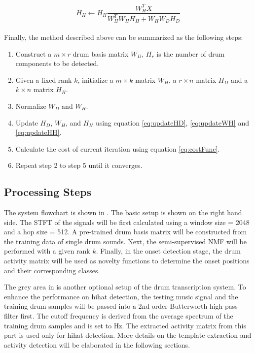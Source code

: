 \documentclass{article}
\begin{document}
\begin{equation}
H_{H} \leftarrow H_{H}\frac{W_{H}^T X}{W_{H}^T W_{H} H_{H} + W_{H} W_{D} H_{D}}
\label{eq:updateHH}
\end{equation}\\


Finally, the method described above can be summarized as the following steps:
\begin{enumerate}
    \item   Construct a $m \times r$ drum basis matrix $W_D$, $H_r$ is the number of drum components to be detected.
    \item   Given a fixed rank $k$, initialize a $m \times k$ matrix $W_H$, a $r \times n$ matrix $H_D$ and a $k \times n$ matrix $H_H$.
    \item   Normalize $W_D$ and $W_H$.
    \item   Update $H_D$, $W_H$, and $H_H$ using equation \eqref{eq:updateHD}, \eqref{eq:updateWH} and \eqref{eq:updateHH}.
    \item   Calculate the cost of current iteration using equation \eqref{eq:costFunc}.
    \item   Repeat step 2 to step 5 until it converges.
\end{enumerate}

\subsection{Processing Steps}\label{subsec:processing steps}

The system flowchart is shown in . The basic setup is shown on the right hand side. The STFT of the signals will be first calculated using a window size = 2048 and a hop size = 512. A pre-trained drum basis matrix will be constructed from the training data of single drum sounds. Next, the semi-supervised NMF will be performed with a given rank $k$. Finally, in the onset detection stage, the drum activity matrix will be used as novelty functions to determine the onset positions and their corresponding classes.  

The grey area in  is another optional setup of the drum transcription system. To enhance the performance on hihat detection, the testing music signal and the training drum samples will be passed into a 2nd order Butterworth high-pass filter first. The cutoff frequency is derived from the average spectrum of the training drum samples and is set to \unit[8000]{Hz}. The extracted activity matrix from this part is used only for hihat detection. More details on the template extraction and activity detection will be elaborated in the following sections. 
\end{document}
